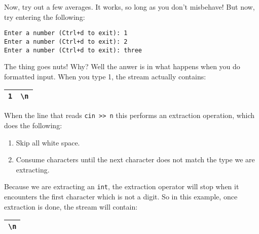 \documentclass[]{article}
\begin{document}
Now, try out a few averages.  It works, so long as you don't misbehave!  But now,
try entering the following:

\begin{BVerbatim}
Enter a number (Ctrl+d to exit): 1
Enter a number (Ctrl+d to exit): 2
Enter a number (Ctrl+d to exit): three
\end{BVerbatim}

The thing goes nuts!  Why?  Well the anwer is in what happens when you
do formatted input.  When you type 1, the stream actually contains:

\begin{tabular}{|c|c|}
    \hline
    \texttt{1} & \texttt{\textbackslash n}  \\
    \hline
\end{tabular}

When the line that reads \texttt{cin >> n} this performs an extraction
operation, which does the following:
\begin{enumerate}
    \item Skip all white space.
    \item Consume characters until the next character does not match
      the type we are extracting.
\end{enumerate}
Because we are extracting an \texttt{int}, the extraction operator will stop
when it encounters the first character which is not a digit. So in this 
example, once extraction is done, the stream will contain:

\begin{tabular}{|c|}
    \hline
    \texttt{\textbackslash n}  \\
    \hline
\end{tabular}
\end{document}
